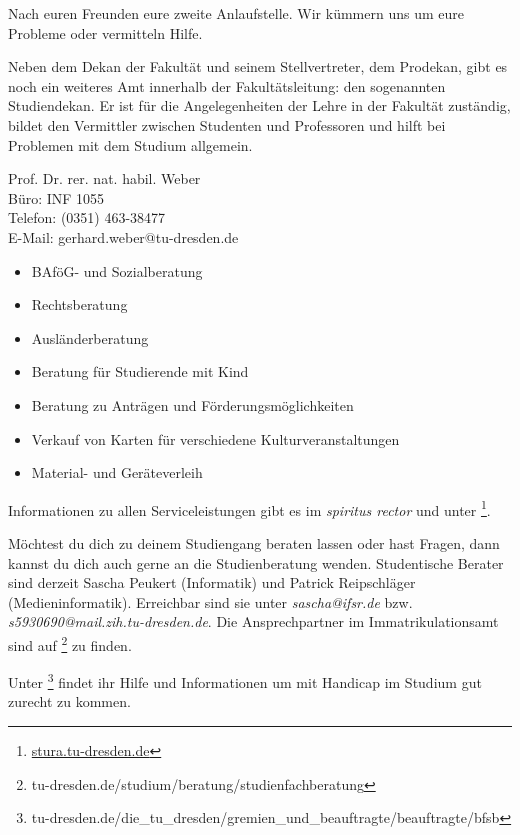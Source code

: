 
Nach euren Freunden eure zweite Anlaufstelle.
Wir kümmern uns um eure Probleme oder vermitteln Hilfe.

Neben dem Dekan der Fakultät und seinem Stellvertreter, dem Prodekan, gibt es noch ein weiteres Amt innerhalb der Fakultätsleitung:
den sogenannten Studiendekan.
Er ist für die Angelegenheiten der Lehre in der Fakultät zuständig, bildet den Vermittler zwischen Studenten und Professoren und hilft bei Problemen mit dem Studium allgemein.

Prof. Dr. rer. nat. habil. Weber \\
Büro: INF 1055 \\
Telefon: (0351) 463-38477 \\
E-Mail: gerhard.weber@tu-dresden.de \\

\begin{itemize}
\item BAföG- und Sozialberatung
\item Rechtsberatung
\item Ausländerberatung
\item Beratung für Studierende mit Kind
\item Beratung zu Anträgen und Förderungsmöglichkeiten
\item Verkauf von Karten für verschiedene Kulturveranstaltungen
\item Material- und Geräteverleih
\end{itemize}

Informationen zu allen Serviceleistungen gibt es im \textit{spiritus rector} und unter \footnote{\url{stura.tu-dresden.de}}.

Möchtest du dich zu deinem Studiengang beraten lassen oder hast Fragen, dann kannst du dich auch gerne an die Studienberatung wenden.
Studentische Berater sind derzeit Sascha Peukert (Informatik) und Patrick Reipschläger (Medieninformatik).
Erreichbar sind sie unter \textit{sascha@ifsr.de} bzw. \textit{s5930690@mail.zih.tu-dresden.de}.
Die Ansprechpartner im Immatrikulationsamt sind auf \footnote{tu-dresden.de/studium/beratung/studienfachberatung} zu finden.

Unter \footnote{tu-dresden.de/die\_tu\_dresden/gremien\_und\_beauftragte/beauftragte/bfsb} findet ihr Hilfe und Informationen um mit Handicap im Studium gut zurecht zu kommen.

